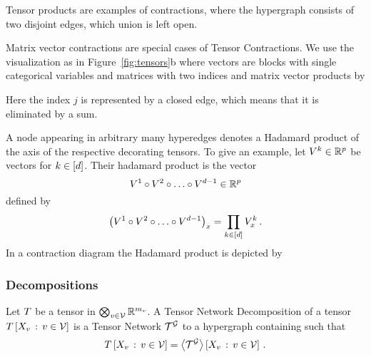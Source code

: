 \begin{example}
	Tensor products are examples of contractions, where the hypergraph consists of two disjoint edges, which union is left open.
\end{example}


\begin{example}
	Matrix vector contractions are special cases of Tensor Contractions.
	We use the visualization as in Figure~\ref{fig:tensors}b where vectors are blocks with single categorical variables and matrices with two indices and matrix vector products by
	\begin{center}
		
	\end{center}
	Here the index $j$ is represented by a closed edge, which means that it is eliminated by a sum.
\end{example}


\begin{example}
	A node appearing in arbitrary many hyperedges denotes a Hadamard product of the axis of the respective decorating tensors.
	To give an example, let $V^k\in\mathbb{R}^p$ be vectors for $k\in[d]$. Their hadamard product is the vector
		\[ V^1\circ V^2 \circ \ldots \circ V^{d-1} \in \mathbb{R}^p \]
	defined by
		\[ \left( V^1\circ V^2 \circ \ldots \circ V^{d-1} \right)_x = \prod_{k\in[d]} V^k_x \, . \]
	In a contraction diagram the Hadamard product is depicted by 
	\begin{center}
		
	\end{center}
\end{example}



\subsubsection{Decompositions}

\begin{definition}\label{def:tnDecomposition}
	Let $T$ be a tensor in $\bigotimes_{v\in\mathcal{V}}\mathbb{R}^{m_{v}}$.
	A Tensor Network Decomposition of a tensor $T\left[X_{v} \, : \, v \in \mathcal{V}\right]$ is a Tensor Network $\mathcal{T}^{\mathcal{G}}$ to a hypergraph containing  such that
		\[ T\left[X_{v} \, : \, v \in \mathcal{V}\right]= \left\langle \mathcal{T}^{\mathcal{G}}\right\rangle \left[ X_{v} \, : \, v \in \mathcal{V} \right] \, . \]
\end{definition}



